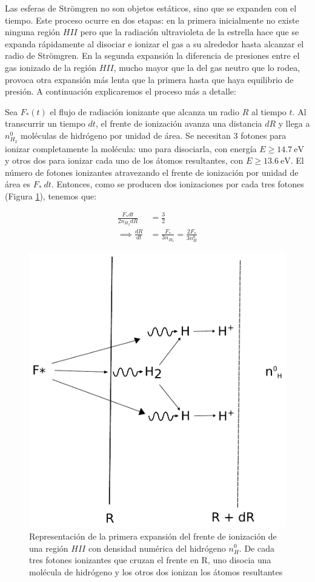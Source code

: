 Las esferas de Strömgren no son objetos estáticos, sino que se expanden con el tiempo. Este proceso ocurre en dos etapas: en la primera inicialmente no existe ninguna región $HII$ pero que la radiación ultravioleta de la estrella hace que se expanda rápidamente al disociar e ionizar el gas a su alrededor hasta alcanzar el radio de Strömgren. En la segunda expansión la diferencia de presiones entre el gas ionizado de la región $HII$, mucho mayor que la del gas neutro que lo rodea, provoca otra expansión más lenta que la primera hasta que haya equilibrio de presión. A continuación explicaremos el proceso más a detalle:

Sea $F_*(t)$ el flujo de radiación ionizante que alcanza un radio $R$ al tiempo $t$. Al transcurrir un tiempo $dt$, el frente de ionización avanza una distancia $dR$ y llega a $n^0_{H_2}$ moléculas de hidrógeno por unidad de área. Se necesitan 3 fotones para ionizar completamente la molécula: uno para disociarla, con energía $E\geq 14.7\mathrm{~eV}$ y otros dos para ionizar cada uno de los átomos resultantes, con $E\geq13.6\mathrm{~eV}$. El número de fotones ionizantes atravezando el frente de ionización por unidad de área es $F_*~dt$. Entonces, como se producen dos ionizaciones por cada tres fotones (Figura \ref{fig:ionization}), tenemos que:

\begin{align}
  \frac{F_* dt}{2 n_{H_2} dR} &= \frac{3}{2} \\
  \implies \frac{dR}{dt} &= \frac{F_*}{3n_{H_2}} = \frac{2 F_*}{3 n^0_H}
\end{align}

\begin{figure}
  \includegraphics[width=0.6\linewidth]{./Figures/ionization}
  \caption{Representación de la primera expansión del frente de ionización de una región $HII$ con densidad numérica del hidrógeno $n^0_H$. De cada tres fotones ionizantes que cruzan el frente en R, uno disocia una molécula de hidrógeno y los otros dos ionizan los átomos resultantes \citep{Stahler:2004}}
  \label{fig:ionization}
\end{figure}



